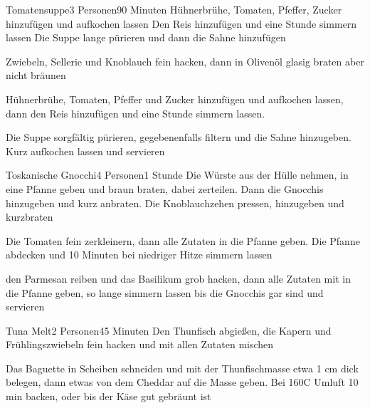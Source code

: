 \begin{recipe}{Tomatensuppe}{3 Personen}{90 Minuten}
Hühnerbrühe, Tomaten, Pfeffer, Zucker hinzufügen und aufkochen lassen
Den Reis hinzufügen und eine Stunde simmern lassen
Die Suppe lange pürieren und dann die Sahne hinzufügen

Zwiebeln, Sellerie und Knoblauch fein hacken, dann in Olivenöl glasig braten aber nicht bräunen

Hühnerbrühe, Tomaten, Pfeffer und Zucker hinzufügen und aufkochen lassen, dann den Reis hinzufügen und eine Stunde simmern lassen.

Die Suppe sorgfältig pürieren, gegebenenfalls filtern und die Sahne hinzugeben. Kurz aufkochen lassen und servieren
\end{recipe}


\begin{recipe}{Toskanische Gnocchi}{4 Personen}{1 Stunde}
Die Würste aus der Hülle nehmen, in eine Pfanne geben und braun braten, dabei zerteilen. Dann die Gnocchis hinzugeben und kurz anbraten. Die Knoblauchzehen pressen, hinzugeben und kurzbraten

Die Tomaten fein zerkleinern, dann alle Zutaten in die Pfanne geben. Die Pfanne abdecken und 10 Minuten bei niedriger Hitze simmern lassen

den Parmesan reiben und das Basilikum grob hacken, dann alle Zutaten mit in die Pfanne geben, so lange simmern lassen bis die Gnocchis gar sind und servieren
\end{recipe}


\begin{recipe}{Tuna Melt}{2 Personen}{45 Minuten}
Den Thunfisch abgießen, die Kapern und Frühlingszwiebeln fein hacken und mit allen Zutaten mischen

Das Baguette in Scheiben schneiden und mit der Thunfischmasse etwa 1 cm dick belegen, dann etwas von dem Cheddar auf die Masse geben.
Bei 160\0C Umluft 10 min backen, oder bis der Käse gut gebräunt ist
\end{recipe}

